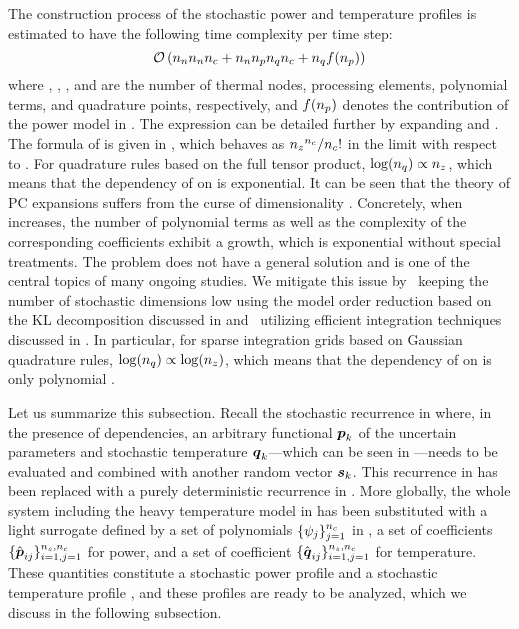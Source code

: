 The construction process of the stochastic power and temperature profiles is
estimated to have the following time complexity per time step:
\[
  \mathcal{O}\left({n_{n}} {n_{n}} {n_{c}} + {n_{n}} {n_{p}} {n_{q}} {n_{c}} + {n_{q}} f({n_{p}})\right)
\]
where \nn, \np, \nc, and \nq are the number of thermal nodes, processing
elements, polynomial terms, and quadrature points, respectively, and $f({n_{p}})$
denotes the contribution of the power model in . The
expression can be detailed further by expanding \nc and \nq. The formula of \nc
is given in , which behaves as ${n_{z}}^{n_{c}} / {n_{c}}!$
in the limit with respect to \nz. For quadrature rules based on the full tensor
product, $\log({n_{q}}) \propto {n_{z}}$, which means that the dependency of \nq on \nz
is exponential. It can be seen that the theory of \ac{PC} expansions suffers
from the curse of dimensionality \cite{eldred2008, xiu2010}. Concretely, when
\nz increases, the number of polynomial terms as well as the complexity of the
corresponding coefficients exhibit a growth, which is exponential without
special treatments. The problem does not have a general solution and is one of
the central topics of many ongoing studies. We mitigate this issue by
\one~keeping the number of stochastic dimensions low using the model order
reduction based on the \ac{KL} decomposition discussed in
 and \two~utilizing efficient integration
techniques discussed in . In particular, for sparse
integration grids based on Gaussian quadrature rules, $\log({n_{q}}) \propto
\log({n_{z}})$, which means that the dependency of \nq on \nz is only polynomial
\cite{heiss2008}.

Let us summarize this subsection. Recall the stochastic recurrence in
 where, in the presence of dependencies, an
arbitrary functional $\boldsymbol{p}_k$ of the uncertain parameters \vu and stochastic
temperature $\boldsymbol{q}_k$---which can be seen in ---needs to
be evaluated and combined with another random vector $\boldsymbol{s}_k$. This recurrence in
 has been replaced with a purely deterministic
recurrence in . More globally, the whole system including
the heavy temperature model in  has been
substituted with a light surrogate defined by a set of polynomials $\{ \psi_j
\}_{j = 1}^{n_{c}}$ in \vz, a set of coefficients $\{ \hat{\boldsymbol{p}}_{ij} \}_{i = 1, j =
1}^{{n_{s}}, {n_{c}}}$ for power, and a set of coefficient $\{ \hat{\boldsymbol{q}}_{ij} \}_{i = 1,
j = 1}^{{n_{s}}, {n_{c}}}$ for temperature. These quantities constitute a stochastic
power profile \mp and a stochastic temperature profile \mq, and these profiles
are ready to be analyzed, which we discuss in the following subsection.

